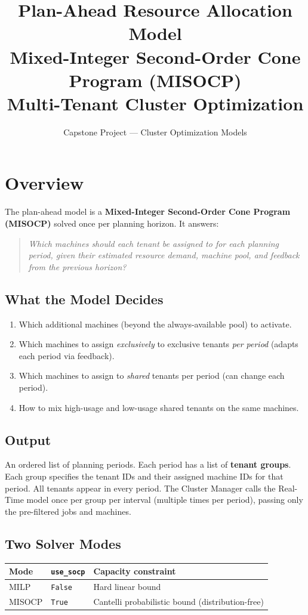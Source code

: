 \documentclass[11pt,a4paper]{article}
\title{\textbf{Plan-Ahead Resource Allocation Model}\\[6pt]
       \large Mixed-Integer Second-Order Cone Program (MISOCP)\\[2pt]
       \normalsize Multi-Tenant Cluster Optimization}
\author{Capstone Project --- Cluster Optimization Models}
\date{}
\begin{document}
\maketitle
\tableofcontents
\bigskip

\section{Overview}

The plan-ahead model is a \textbf{Mixed-Integer Second-Order Cone Program (MISOCP)} solved
once per planning horizon. It answers:

\begin{quote}
\emph{Which machines should each tenant be assigned to for each planning period,
given their estimated resource demand, machine pool, and feedback from the previous horizon?}
\end{quote}

\subsection*{What the Model Decides}
\begin{enumerate}[label=(\arabic*)]
  \item Which additional machines (beyond the always-available pool) to activate.
  \item Which machines to assign \emph{exclusively} to exclusive tenants \emph{per period} (adapts each period via feedback).
  \item Which machines to assign to \emph{shared} tenants per period (can change each period).
  \item How to mix high-usage and low-usage shared tenants on the same machines.
\end{enumerate}

\subsection*{Output}
An ordered list of planning periods. Each period has a list of \textbf{tenant groups}.
Each group specifies the tenant IDs and their assigned machine IDs for that period.
All tenants appear in every period. The Cluster Manager calls the Real-Time model
once per group per interval (multiple times per period), passing only the pre-filtered jobs and machines.

\subsection*{Two Solver Modes}
\begin{center}
\begin{tabular}{lll}
\toprule
Mode & \texttt{use\_socp} & Capacity constraint \\
\midrule
MILP  & \texttt{False} & Hard linear bound \\
MISOCP & \texttt{True} & Cantelli probabilistic bound (distribution-free) \\
\bottomrule
\end{tabular}
\end{center}
\end{document}
